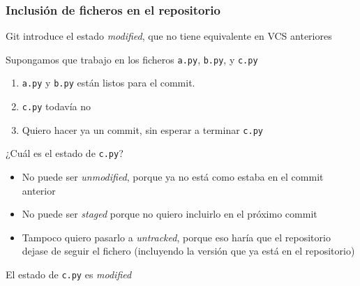 \documentclass[ucs]{beamer}
\begin{document}
\begin{frame}[fragile]
\frametitle{Inclusión de ficheros en el repositorio}
Git introduce el estado \emph{modified}, que no tiene 
equivalente en VCS anteriores

Supongamos que trabajo en los ficheros 
\verb|a.py|,
\verb|b.py|,
y
\verb|c.py|

\begin{enumerate}
\item
\verb|a.py|
y
\verb|b.py|
están listos para el commit.
\item
\verb|c.py| todavía no
\item
Quiero hacer ya un commit, sin esperar a terminar \verb|c.py|

\end{enumerate}

¿Cuál es el estado de \verb|c.py|?

\begin{itemize}
\item
No puede ser \emph{unmodified}, porque ya no está como estaba en el commit anterior
\item
No puede ser \emph{staged} porque no quiero incluirlo en el próximo commit
\item
Tampoco quiero pasarlo a \emph{untracked}, porque eso haría que el repositorio
dejase de seguir el fichero (incluyendo la versión que ya está en el repositorio)
\end{itemize}
El estado de 
\verb|c.py|
es \emph{modified}

\end{frame}
\end{document}
